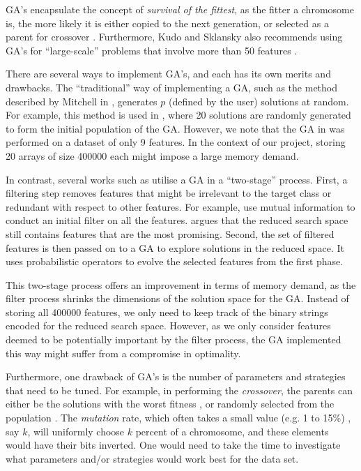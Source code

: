 \documentclass[12pt, twoside, a4paper]{report}
\begin{document}
GA's encapsulate the concept of \textit{survival of the fittest}, as the fitter a chromosome is, the more likely it is either copied to the next generation, or selected as a parent for crossover \cite{RefWorks:209}. Furthermore, Kudo and Sklansky also recommends using GA's for ``large-scale'' problems that involve more than 50 features \cite{RefWorks:210}.

There are several ways to implement GA's, and each has its own merits and drawbacks. The ``traditional'' way of implementing a GA, such as the method described by Mitchell in \cite{RefWorks:205}, generates $p$ (defined by the user) solutions at random. For example, this method is used in \cite{RefWorks:206}, where 20 solutions are randomly generated to form the initial population of the GA. However, we note that the GA in \cite{RefWorks:206} was performed on a dataset of only 9 features. In the context of our project, storing 20 arrays of size 400000 each might impose a large memory demand.

In contrast, several works such as \cite{RefWorks:197, RefWorks:198, RefWorks:199, RefWorks:200, RefWorks:203} utilise a GA in a ``two-stage'' process. First, a filtering step removes features that might be irrelevant to the target class or redundant with respect to other features. For example, \cite{RefWorks:197, RefWorks:198, RefWorks:203} use mutual information to conduct an initial filter on all the features. \cite{RefWorks:201} argues that the reduced search space still contains features that are the most promising. Second, the set of filtered features is then passed on to a GA to explore solutions in the reduced space. It uses probabilistic operators to evolve the selected features from the first phase.

This two-stage process offers an improvement in terms of memory demand, as the filter process shrinks the dimensions of the solution space for the GA. Instead of storing all 400000 features, we only need to keep track of the binary strings encoded for the reduced search space. However, as we only consider features deemed to be potentially important by the filter process, the GA implemented this way might suffer from a compromise in optimality.

Furthermore, one drawback of GA's is the number of parameters and strategies that need to be tuned. For example, in performing the \textit{crossover}, the parents can either be  the solutions with the worst fitness \cite{RefWorks:203}, or randomly selected from the population \cite{RefWorks:205}. The \textit{mutation} rate, which often takes a small value (e.g. 1 to 15\%) \cite{RefWorks:206}, say $k$, will uniformly choose $k$ percent of a chromosome, and these elements would have their bits inverted. One would need to take the time to investigate what parameters and/or strategies would work best for the data set.
\end{document}
